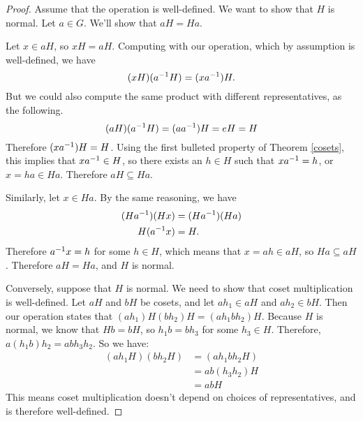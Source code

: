 \begin{proof}

Assume that the operation is well-defined. We want to show that $H$ is normal. Let $a \in G$. We'll show that $aH = Ha$.

Let $x \in aH$, so $xH = aH$. Computing with our operation, which by assumption is well-defined, we have
\begin{equation*}
    (xH)(a^{-1} H) = (xa^{-1})H.
\end{equation*}
But we could also compute the same product with different representatives, as the following.
\begin{equation*}
    (aH)(a^{-1} H) = (a a^{-1})H = eH = H
\end{equation*}
Therefore $(xa^{-1})H = H$. Using the first bulleted property of Theorem \ref{cosets}, this implies that $xa^{-1} \in H$, so there exists an $h \in H$ such that $xa^{-1} = h$, or $x = ha \in Ha$. Therefore $aH \subseteq Ha$.

Similarly, let $x \in Ha$. By the same reasoning, we have
\begin{align*}
    (Ha^{-1})(Hx) &= (Ha^{-1})(Ha) \\
    H(a^{-1} x) &= H.
\end{align*}
Therefore $a^{-1} x = h$ for some $h \in H$, which means that $x = ah \in aH$, so $Ha \subseteq aH$. Therefore $aH = Ha$, and $H$ is normal.

Conversely, suppose that $H$ is normal. We need to show that coset multiplication is well-defined. Let $aH$ and $bH$ be cosets, and let $ah_1 \in aH$ and $ah_2 \in bH$. Then our operation states that $(ah_1)H(bh_2)H = (ah_1bh_2)H$. Because $H$ is normal, we know that $Hb = bH$, so $h_1 b = b h_3$ for some $h_3 \in H$. Therefore, $a\left(h_1b\right) h_2 = ab h_3 h_2$. So we have:
\begin{align*}
    \left(ah_1 H\right)\left(bh_2 H\right) &= \left(ah_1bh_2 H\right) \\
    &= ab\left(h_3 h_2\right)H \\
    &= ab H
\end{align*}
This means coset multiplication doesn't depend on choices of representatives, and is therefore well-defined.

\end{proof}

